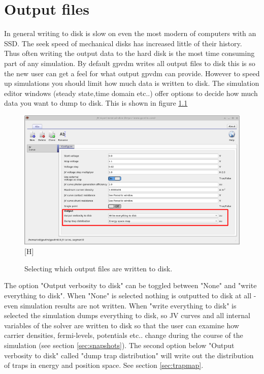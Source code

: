 \chapter{Output files}
In general writing to disk is slow on even the most modern of computers with an SSD.  The seek speed of mechanical disks has increased little of their history.  Thus often writing the output data to the hard disk is the most time consuming part of any simulation.  By default gpvdm writes all output files to disk this is so the new user can get a feel for what output gpvdm can provide.  However to speed up simulations you should limit how much data is written to disk. The simulation editor windows (steady state,time domain etc..) offer options to decide how much data you want to dump to disk. This is shown in figure \ref{fig:jveditorwindow} 

\begin{figure}[H]
\centering
\includegraphics[width=\textwidth]{./images/jv_editor_window.png}[H]
\caption{Selecting which output files are written to disk.}
\label{fig:jveditorwindow}
\end{figure}

The option "Output verbosity to disk" can be toggled between "None" and "write everything to disk".  When "None" is selected nothing is outputted to disk at all - even simulation results are not written.  When "write everything to disk" is selected the simulation dumps everything to disk, so JV curves and all internal variables of the solver are written to disk so that the user can examine how carrier densities, fermi-levels, potentials etc.. change during the course of the simulation (see section \ref{sec:snapshots}). The second option below "Output verbosity to disk" called "dump trap distribution" will write out the distribution of traps in energy and position space.  See section \ref{sec:trapmap}.


